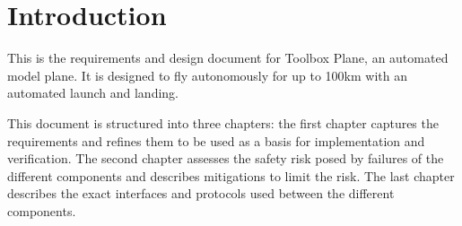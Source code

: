 \chapter{Introduction}
This is the requirements and design document for
Toolbox Plane, an automated model plane. It is designed
to fly autonomously for up to 100km with an automated launch
and landing.

This document is structured into three chapters: the first
chapter captures the requirements and refines them to be
used as a basis for implementation and verification.
The second chapter assesses the safety risk posed by failures
of the different components and describes mitigations
to limit the risk. The last chapter describes the exact
interfaces and protocols used between the different
components.
